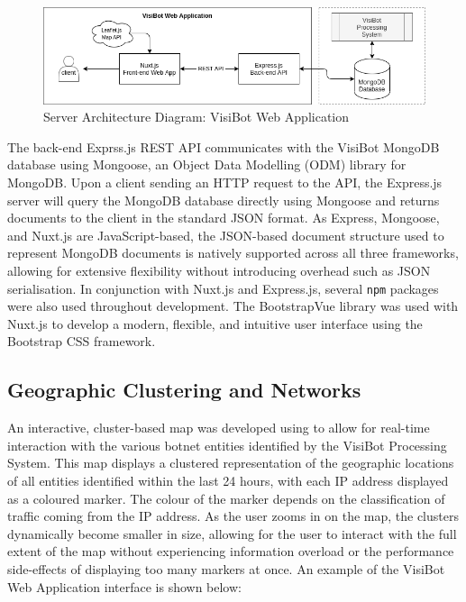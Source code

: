\begin{figure}[!htb]
    \centering
    \includegraphics[width=0.75\linewidth]{flowcharts/frontend_flow_diagram.png}
    \caption{Server Architecture Diagram: VisiBot Web Application}
    \label{fig:frontend_server_architecture} 
\end{figure}

\newpage

The back-end Exprss.js REST API communicates with the VisiBot MongoDB database using Mongoose, an Object Data Modelling (ODM) library for MongoDB. \citep{Mongoose} Upon a client sending an HTTP request to the API, the Express.js server will query the MongoDB database directly using Mongoose and returns documents to the client in the standard JSON format. As Express, Mongoose, and Nuxt.js are JavaScript-based, the JSON-based document structure used to represent MongoDB documents is natively supported across all three frameworks, allowing for extensive flexibility without introducing overhead such as JSON serialisation. In conjunction with Nuxt.js and Express.js, several \texttt{npm} packages were also used throughout development. The BootstrapVue \citep{BootstrapVue} library was used with Nuxt.js to develop a modern, flexible, and intuitive user interface using the Bootstrap CSS framework.

\subsection{Geographic Clustering and Networks}

An interactive, cluster-based map was developed using \citep{LeafletJS} to allow for real-time interaction with the various botnet entities identified by the VisiBot Processing System. This map displays a clustered representation of the geographic locations of all entities identified within the last 24 hours, with each IP address displayed as a coloured marker. The colour of the marker depends on the classification of traffic coming from the IP address. As the user zooms in on the map, the clusters dynamically become smaller in size, allowing for the user to interact with the full extent of the map without experiencing information overload or the performance side-effects of displaying too many markers at once. An example of the VisiBot Web Application interface is shown below:


